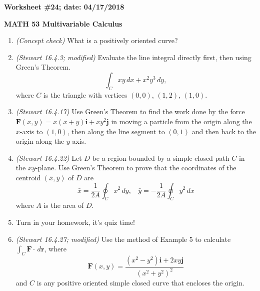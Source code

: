 \documentclass{article}
\newcommand{\ii}{\mathbf{i}}
\newcommand{\jj}{\mathbf{j}}
\newcommand{\rr}{\mathbf{r}}
\begin{document}
{\bf Worksheet \#24; date: 04/17/2018}

{\bf MATH 53 Multivariable Calculus}

\begin{enumerate}
\item {\em (Concept check)} What is a positively oriented curve?

\item {\em (Stewart 16.4.3; modified)} Evaluate the line integral directly first, then using Green's Theorem.
\[
\int_C xy \,dx + x^2 y^3 \,dy,
\]
where $C$ is the triangle with vertices $(0, 0)$, $(1, 2)$, $(1, 0)$.

\item {\em (Stewart 16.4.17)} Use Green's Theorem to find the work done by the force $\mathbf{F}(x, y) = x(x+y) \ii + xy^2 \jj$ in moving a particle from the origin along the $x$-axis to $(1, 0)$, then along the line segment to $(0, 1)$ and then back to the origin along the $y$-axis.

\item {\em (Stewart 16.4.22)} Let $D$ be a region bounded by a simple closed path $C$ in the $xy$-plane. Use Green's Theorem to prove that the coordinates of the centroid $(\bar{x}, \bar{y})$ of $D$ are
\[
\bar{x} = \frac{1}{2A} \oint_C x^2 \,dy, ~~~~ \bar{y} = -\frac{1}{2A} \oint_C y^2 \,dx
\]
where $A$ is the area of $D$.

\item Turn in your homework, it's quiz time!

\item {\em (Stewart 16.4.27; modified)} Use the method of Example 5 to calculate $\int_C \mathbf{F} \cdot \,d\rr$, where
\[
\mathbf{F}(x, y) = \frac{(x^2 - y^2) \ii + 2xy \jj}{(x^2 + y^2)^2}
\]
and $C$ is any positive oriented simple closed curve that encloses the origin.
\end{enumerate}
\end{document}
